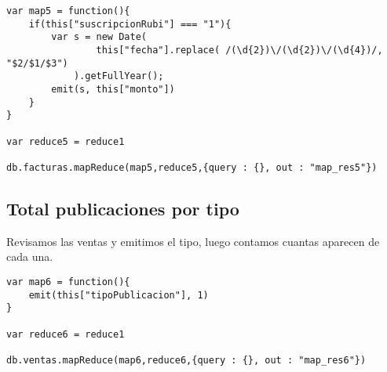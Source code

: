\begin{verbatim}
var map5 = function(){
    if(this["suscripcionRubi"] === "1"){
        var s = new Date(
                this["fecha"].replace( /(\d{2})\/(\d{2})\/(\d{4})/, "$2/$1/$3")
            ).getFullYear();
        emit(s, this["monto"])		
    }
}

var reduce5 = reduce1

db.facturas.mapReduce(map5,reduce5,{query : {}, out : "map_res5"})
\end{verbatim}

\subsection{Total publicaciones por tipo}

Revisamos las ventas y emitimos el tipo, luego contamos cuantas aparecen de cada una.

\begin{verbatim}
var map6 = function(){
    emit(this["tipoPublicacion"], 1)		
}

var reduce6 = reduce1

db.ventas.mapReduce(map6,reduce6,{query : {}, out : "map_res6"})
\end{verbatim}

